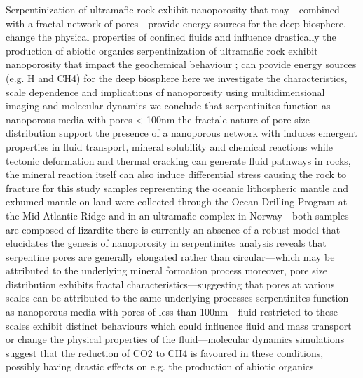 \markdownRendererDocumentBegin
{} Serpentinization of ultramafic rock exhibit nanoporosity that may—combined with a fractal network of pores—provide energy sources for the deep biosphere, change the physical properties of confined fluids and influence drastically the production of abiotic organics\markdownRendererInterblockSeparator
{}\markdownRendererUlBegin
\markdownRendererUlItem serpentinization of ultramafic rock exhibit nanoporosity that impact the geochemical behaviour ; can provide energy sources (e.g. H and CH4) for the deep biosphere\markdownRendererUlItemEnd 
\markdownRendererUlItem here we investigate the characteristics, scale dependence and implications of nanoporosity\markdownRendererUlItemEnd 
\markdownRendererUlItem using multidimensional imaging and molecular dynamics we conclude that serpentinites function as nanoporous media with pores < 100nm\markdownRendererUlItemEnd 
\markdownRendererUlItem the fractale nature of pore size distribution support the presence of a nanoporous network with induces emergent properties in fluid transport, mineral solubility and chemical reactions\markdownRendererUlItemEnd 
\markdownRendererUlItem while tectonic deformation and thermal cracking can generate fluid pathways in rocks, the mineral reaction itself can also induce differential stress causing the rock to fracture\markdownRendererUlItemEnd 
\markdownRendererUlItem for this study samples representing the oceanic lithospheric mantle and exhumed mantle on land were collected through the Ocean Drilling Program at the Mid-Atlantic Ridge and in an ultramafic complex in Norway—both samples are composed of lizardite\markdownRendererUlItemEnd 
\markdownRendererUlItem there is currently an absence of a robust model that elucidates the genesis of nanoporosity in serpentinites\markdownRendererUlItemEnd 
\markdownRendererUlItem analysis reveals that serpentine pores are generally elongated rather than circular—which may be attributed to the underlying mineral formation process\markdownRendererUlItemEnd 
\markdownRendererUlItem moreover, pore size distribution exhibits fractal characteristics—suggesting that pores at various scales can be attributed to the same underlying processes\markdownRendererUlItemEnd 
\markdownRendererUlItem serpentinites function as nanoporous media with pores of less than 100nm—fluid restricted to these scales exhibit distinct behaviours which could influence fluid and mass transport or change the physical properties of the fluid—molecular dynamics simulations suggest that the reduction of CO2 to CH4 is favoured in these conditions, possibly having drastic effects on e.g. the production of abiotic organics\markdownRendererUlItemEnd 
\markdownRendererUlEnd \markdownRendererDocumentEnd